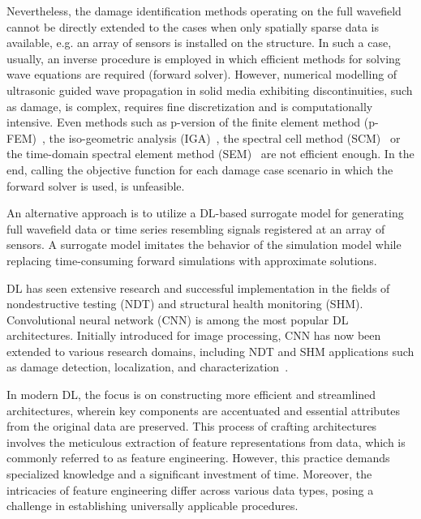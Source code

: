 Nevertheless, the damage identification methods operating on the full wavefield cannot be directly extended to the cases when only spatially sparse data is available, e.g. an array of sensors is installed on the structure.
In such a case, usually, an inverse procedure is employed in which efficient methods for solving wave equations are required (forward solver).  
However, numerical modelling of ultrasonic guided wave propagation in solid media exhibiting discontinuities, such as damage, is complex, requires fine discretization and is computationally intensive.
Even methods such as p-version of the finite element method (p-FEM)~\cite{Duczek2013}, the iso-geometric analysis (IGA)~\cite{Anitescu2019}, the spectral cell method (SCM)~\cite{Mossaiby2019} or the time-domain spectral element method (SEM)~\cite{Ostachowicz2012} are not efficient enough.
In the end, calling the objective function for each damage case scenario in which the forward solver is used, is unfeasible.

An alternative approach is to utilize a DL-based surrogate model for generating full wavefield data or time series resembling signals registered at an array of sensors. 
A surrogate model imitates the behavior of the simulation model while replacing time-consuming forward simulations with approximate solutions.

DL has seen extensive research and successful implementation in the fields of nondestructive testing (NDT) and structural health monitoring (SHM). 
Convolutional neural network (CNN) is among the most popular DL architectures. 
Initially introduced for image processing, CNN has now been extended to various research domains, including NDT and SHM applications such as damage detection, localization, and characterization~\cite{rautela2019deep, pandey2022explainable, ijjeh2021full, ijjeh2022deep}.

In modern DL, the focus is on constructing more efficient and streamlined architectures, wherein key components are accentuated and essential attributes from the original data are preserved. 
This process of crafting architectures involves the meticulous extraction of feature representations from data, which is commonly referred to as feature engineering. 
However, this practice demands specialized knowledge and a significant investment of time. 
Moreover, the intricacies of feature engineering differ across various data types, posing a challenge in establishing universally applicable procedures.

